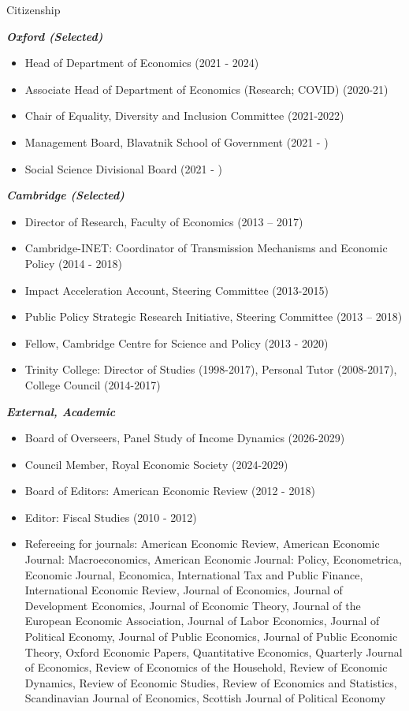 \documentclass{resume} %
\begin{document}
\begin{rSection}{Citizenship}

\item \textit{\textbf{Oxford (Selected)}}
\begin{itemize} 
\item Head of Department of Economics (2021 - 2024)
\item Associate Head of Department of Economics (Research; COVID) (2020-21) 
\item Chair of Equality, Diversity and Inclusion Committee (2021-2022)
\item Management Board, Blavatnik School of Government (2021 - )
\item Social Science Divisional Board (2021 - ) 
\end{itemize}

\item \textit{\textbf{Cambridge (Selected)}}
\begin{itemize} 
\item Director of Research, Faculty of Economics (2013 – 2017) 
\item Cambridge-INET: Coordinator of Transmission Mechanisms and Economic Policy (2014 - 2018)
\item Impact Acceleration Account, Steering Committee  (2013-2015)
\item Public Policy Strategic Research Initiative, Steering Committee (2013 – 2018)
\item Fellow, Cambridge Centre for Science and Policy (2013 - 2020)
\item Trinity College: Director of Studies (1998-2017), Personal Tutor (2008-2017), College Council (2014-2017) 
\end{itemize}
\newpage
\item \textit{\textbf{External, Academic}}
\begin{itemize} 
\item Board of Overseers, Panel Study of Income Dynamics (2026-2029)
\item Council Member, Royal Economic Society (2024-2029)
\item Board of Editors: American Economic Review (2012 - 2018)
\item Editor: Fiscal Studies (2010 - 2012)
\item Refereeing for journals: American Economic Review, American Economic Journal: Macroeconomics, American Economic Journal: Policy, Econometrica, Economic Journal, Economica, International Tax and Public Finance, International Economic Review, Journal of Economics, Journal of Development Economics, Journal of Economic Theory, Journal of the European Economic Association, Journal of Labor Economics, Journal of Political Economy, Journal of Public Economics, Journal of Public Economic Theory, Oxford Economic Papers, Quantitative Economics, Quarterly Journal of Economics, Review of Economics of the Household, Review of Economic Dynamics, Review of Economic Studies, Review of Economics and Statistics, Scandinavian Journal of Economics, Scottish Journal of Political Economy

\end{itemize}
\end{rSection}
\end{document}
